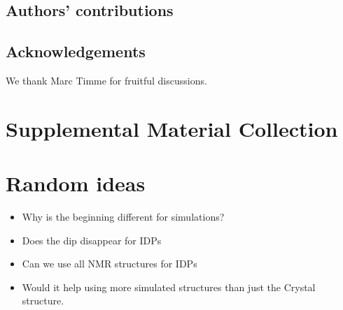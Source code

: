 \documentclass[
reprint,
twocolumn,
amsmath,amssymb,superscriptaddress,aps,
pre]{revtex4-1}
\begin{document}
\subsection{Authors' contributions}

\subsection{Acknowledgements}
We thank Marc Timme for fruitful discussions.




\appendix
\section{Supplemental Material Collection}
\section{Random ideas}
\begin{itemize}
    \item Why is the beginning different for simulations?
    \item Does the dip disappear for IDPs
    \item Can we use all NMR structures for IDPs
    \item Would it help using more simulated structures than just the Crystal structure. 
\end{itemize}
\end{document}
